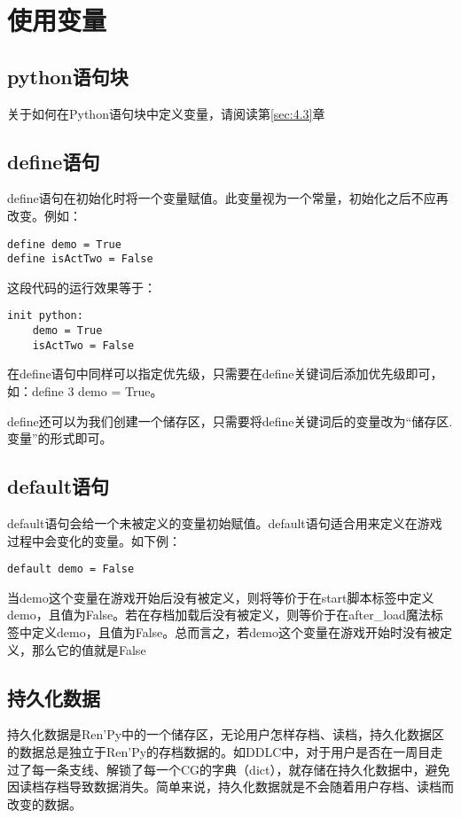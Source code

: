 \section{使用变量}
\subsection{python语句块}
关于如何在Python语句块中定义变量，请阅读第\ref{sec:4.3}章
\subsection{define语句}
define语句在初始化时将一个变量赋值。此变量视为一个常量，初始化之后不应再改变。例如：

\begin{lstlisting}
define demo = True
define isActTwo = False
\end{lstlisting}

这段代码的运行效果等于：
\begin{lstlisting}
init python:
    demo = True
    isActTwo = False
\end{lstlisting}

\begin{ExtraKnowledge}
    在define语句中同样可以指定优先级，只需要在define关键词后添加优先级即可，如：define 3 demo = True。
\end{ExtraKnowledge}

define还可以为我们创建一个储存区，只需要将define关键词后的变量改为“储存区.变量”的形式即可。

\subsection{default语句}
default语句会给一个未被定义的变量初始赋值。default语句适合用来定义在游戏过程中会变化的变量。如下例：
\begin{lstlisting}[numbers=none]
default demo = False
\end{lstlisting}

当demo这个变量在游戏开始后没有被定义，则将等价于在start脚本标签中定义demo，且值为False。若在存档加载后没有被定义，则等价于在after\_load魔法标签中定义demo，且值为False。总而言之，若demo这个变量在游戏开始时没有被定义，那么它的值就是False

\subsection{持久化数据}

持久化数据是Ren'Py中的一个储存区，无论用户怎样存档、读档，持久化数据区的数据总是独立于Ren'Py的存档数据的。如DDLC中，对于用户是否在一周目走过了每一条支线、解锁了每一个CG的字典（dict），就存储在持久化数据中，避免因读档存档导致数据消失。简单来说，持久化数据就是不会随着用户存档、读档而改变的数据。

